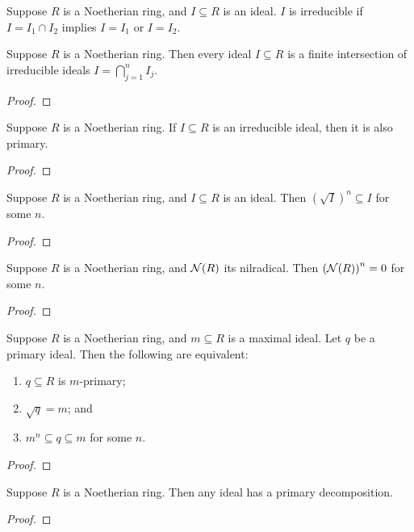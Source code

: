 \begin{definition}
    Suppose \(R\) is a Noetherian ring, and \(I \subseteq R\) is an ideal.
    \(I\) is irreducible if \(I = I_1 \cap I_2\) implies \(I = I_1\) or \(I = I_2\).
\end{definition}
\begin{lemma}
    Suppose \(R\) is a Noetherian ring.
    Then every ideal \(I \subseteq R\) is a finite intersection of irreducible ideals
    \(I = \bigcap_{j=1}^n I_j\).
\end{lemma}
\begin{proof}
    
\end{proof}
\begin{lemma}
    Suppose \(R\) is a Noetherian ring.
    If \(I \subseteq R\) is an irreducible ideal,
    then it is also primary.
\end{lemma}
\begin{proof}
    
\end{proof}
\begin{proposition}
    Suppose \(R\) is a Noetherian ring, and \(I \subseteq R\) is an ideal.
    Then \({(\sqrt{I})^n} \subseteq I\) for some \(n\).
\end{proposition}
\begin{proof}
    
\end{proof}
\begin{corollary}
    Suppose \(R\) is a Noetherian ring, and \(\mathcal{N}(R)\) its nilradical.
    Then \({(\mathcal{N}(R))}^n = 0\) for some \(n\).
\end{corollary}
\begin{proof}
    
\end{proof}
\begin{corollary}
    Suppose \(R\) is a Noetherian ring, and \(m \subseteq R\) is a maximal ideal.
    Let \(q\) be a primary ideal.
    Then the following are equivalent:
    \begin{enumerate}[label={(\alph*)}, itemsep=0mm]
        \item \(q \subseteq R\) is \(m\)-primary;
        \item \(\sqrt{q} = m\); and
        \item \(m^n \subseteq q \subseteq m\) for some \(n\).
    \end{enumerate}
\end{corollary}
\begin{proof}
    
\end{proof}

\begin{theorem}
    Suppose \(R\) is a Noetherian ring.
    Then any ideal has a primary decomposition.
\end{theorem}
\begin{proof}
    
\end{proof}
